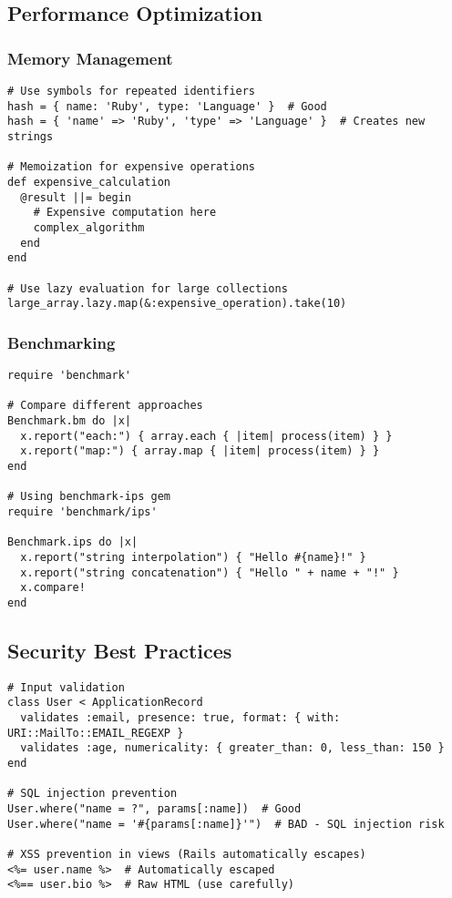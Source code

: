 \documentclass[12pt,a4paper]{article}
\begin{document}
\subsection{Performance Optimization}

\subsubsection{Memory Management}

\begin{lstlisting}
# Use symbols for repeated identifiers
hash = { name: 'Ruby', type: 'Language' }  # Good
hash = { 'name' => 'Ruby', 'type' => 'Language' }  # Creates new strings

# Memoization for expensive operations
def expensive_calculation
  @result ||= begin
    # Expensive computation here
    complex_algorithm
  end
end

# Use lazy evaluation for large collections
large_array.lazy.map(&:expensive_operation).take(10)
\end{lstlisting}

\subsubsection{Benchmarking}

\begin{lstlisting}
require 'benchmark'

# Compare different approaches
Benchmark.bm do |x|
  x.report("each:") { array.each { |item| process(item) } }
  x.report("map:") { array.map { |item| process(item) } }
end

# Using benchmark-ips gem
require 'benchmark/ips'

Benchmark.ips do |x|
  x.report("string interpolation") { "Hello #{name}!" }
  x.report("string concatenation") { "Hello " + name + "!" }
  x.compare!
end
\end{lstlisting}

\subsection{Security Best Practices}

\begin{lstlisting}
# Input validation
class User < ApplicationRecord
  validates :email, presence: true, format: { with: URI::MailTo::EMAIL_REGEXP }
  validates :age, numericality: { greater_than: 0, less_than: 150 }
end

# SQL injection prevention
User.where("name = ?", params[:name])  # Good
User.where("name = '#{params[:name]}'")  # BAD - SQL injection risk

# XSS prevention in views (Rails automatically escapes)
<%= user.name %>  # Automatically escaped
<%== user.bio %>  # Raw HTML (use carefully)
\end{lstlisting}
\end{document}
